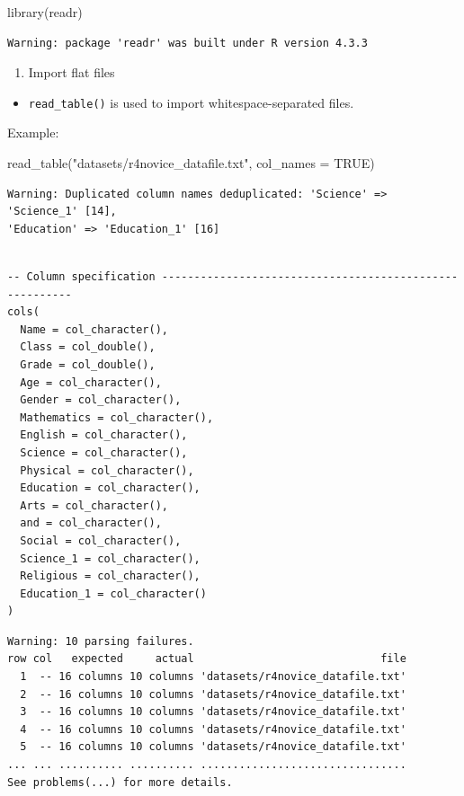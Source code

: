 \documentclass[
  letterpaper,
  DIV=11,
  numbers=noendperiod]{scrreprt}
\newenvironment{Shaded}{\begin{snugshade}}{\end{snugshade}}
\newcommand{\AttributeTok}[1]{\textcolor[rgb]{0.40,0.45,0.13}{#1}}
\newcommand{\ConstantTok}[1]{\textcolor[rgb]{0.56,0.35,0.01}{#1}}
\newcommand{\FunctionTok}[1]{\textcolor[rgb]{0.28,0.35,0.67}{#1}}
\newcommand{\NormalTok}[1]{\textcolor[rgb]{0.00,0.23,0.31}{#1}}
\newcommand{\StringTok}[1]{\textcolor[rgb]{0.13,0.47,0.30}{#1}}
\providecommand{\tightlist}{%
  \setlength{\itemsep}{0pt}\setlength{\parskip}{0pt}}\usepackage{longtable,booktabs,array}
\begin{document}
\begin{Shaded}
\begin{Highlighting}[]
\FunctionTok{library}\NormalTok{(readr)}
\end{Highlighting}
\end{Shaded}

\begin{verbatim}
Warning: package 'readr' was built under R version 4.3.3
\end{verbatim}

\begin{enumerate}
\def\labelenumi{\alph{enumi}.}
\tightlist
\item
  Import flat files
\end{enumerate}

\begin{itemize}
\tightlist
\item
  \texttt{read\_table()} is used to import whitespace-separated files.
\end{itemize}

Example:

\begin{Shaded}
\begin{Highlighting}[]
\FunctionTok{read\_table}\NormalTok{(}\StringTok{"datasets/r4novice\_datafile.txt"}\NormalTok{, }\AttributeTok{col\_names =} \ConstantTok{TRUE}\NormalTok{)}
\end{Highlighting}
\end{Shaded}

\begin{verbatim}
Warning: Duplicated column names deduplicated: 'Science' => 'Science_1' [14],
'Education' => 'Education_1' [16]
\end{verbatim}

\begin{verbatim}

-- Column specification --------------------------------------------------------
cols(
  Name = col_character(),
  Class = col_double(),
  Grade = col_double(),
  Age = col_character(),
  Gender = col_character(),
  Mathematics = col_character(),
  English = col_character(),
  Science = col_character(),
  Physical = col_character(),
  Education = col_character(),
  Arts = col_character(),
  and = col_character(),
  Social = col_character(),
  Science_1 = col_character(),
  Religious = col_character(),
  Education_1 = col_character()
)
\end{verbatim}

\begin{verbatim}
Warning: 10 parsing failures.
row col   expected     actual                             file
  1  -- 16 columns 10 columns 'datasets/r4novice_datafile.txt'
  2  -- 16 columns 10 columns 'datasets/r4novice_datafile.txt'
  3  -- 16 columns 10 columns 'datasets/r4novice_datafile.txt'
  4  -- 16 columns 10 columns 'datasets/r4novice_datafile.txt'
  5  -- 16 columns 10 columns 'datasets/r4novice_datafile.txt'
... ... .......... .......... ................................
See problems(...) for more details.
\end{verbatim}
\end{document}

